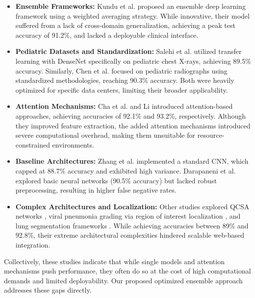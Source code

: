 \documentclass[conference]{IEEEtran}
\begin{document}
\begin{itemize}
    \item \textbf{Ensemble Frameworks:} Kundu et al. \cite{kundu2021} proposed an ensemble deep learning framework using a weighted averaging strategy. While innovative, their model suffered from a lack of cross-domain generalization, achieving a peak test accuracy of 91.2\%, and lacked a deployable clinical interface.
    
    \item \textbf{Pediatric Datasets and Standardization:} Salehi et al. \cite{salehi2021} utilized transfer learning with DenseNet specifically on pediatric chest X-rays, achieving 89.5\% accuracy. Similarly, Chen et al. \cite{chen2021} focused on pediatric radiographs using standardized methodologies, reaching 90.3\% accuracy. Both were heavily optimized for specific data centers, limiting their broader applicability.
    
    \item \textbf{Attention Mechanisms:} Cha et al. \cite{cha2021} and Li \cite{li2024} introduced attention-based approaches, achieving accuracies of 92.1\% and 93.2\%, respectively. Although they improved feature extraction, the added attention mechanisms introduced severe computational overhead, making them unsuitable for resource-constrained environments.
    
    \item \textbf{Baseline Architectures:} Zhang et al. \cite{zhang2021} implemented a standard CNN, which capped at 88.7\% accuracy and exhibited high variance. Darapaneni et al. \cite{darapaneni2022} explored basic neural networks (90.5\% accuracy) but lacked robust preprocessing, resulting in higher false negative rates.
    
    \item \textbf{Complex Architectures and Localization:} Other studies explored QCSA networks \cite{qcsa2023}, viral pneumonia grading via region of interest localization \cite{viral2023}, and lung segmentation frameworks \cite{lungseg2023}. While achieving accuracies between 89\% and 92.8\%, their extreme architectural complexities hindered scalable web-based integration.
\end{itemize}

Collectively, these studies indicate that while single models and attention mechanisms push performance, they often do so at the cost of high computational demands and limited deployability. Our proposed optimized ensemble approach addresses these gaps directly.
\end{document}
